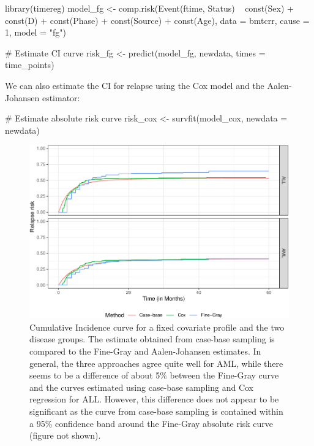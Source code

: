 \begin{Schunk}
\begin{Sinput}
library(timereg)
model_fg <- comp.risk(Event(ftime, Status) ~ const(Sex) + const(D) +
                        const(Phase) + const(Source) + const(Age),
                      data = bmtcrr, cause = 1, model = "fg")

# Estimate CI curve
risk_fg <- predict(model_fg, newdata, times = time_points)
\end{Sinput}
\end{Schunk}

We can also estimate the CI for relapse using the Cox model and the Aalen-Johansen estimator:

\begin{Schunk}
\begin{Sinput}
# Estimate absolute risk curve
risk_cox <- survfit(model_cox, newdata = newdata)
\end{Sinput}
\end{Schunk}

\begin{figure}[ht]
\includegraphics[width=\textwidth,keepaspectratio=true]{./compAbsrisk-1} \caption{Cumulative Incidence curve for a fixed covariate profile and the two disease groups. The estimate obtained from case-base sampling is compared to the Fine-Gray and Aalen-Johansen estimates. In general, the three approaches agree quite well for AML, while there seems to be a difference of about 5\% between the Fine-Gray curve and the curves estimated using case-base sampling and Cox regression for ALL. However, this difference does not appear to be significant as the curve from case-base sampling is contained within a 95\% confidence band around the Fine-Gray absolute risk curve (figure not shown).}\label{fig:compAbsrisk}
\end{figure}

